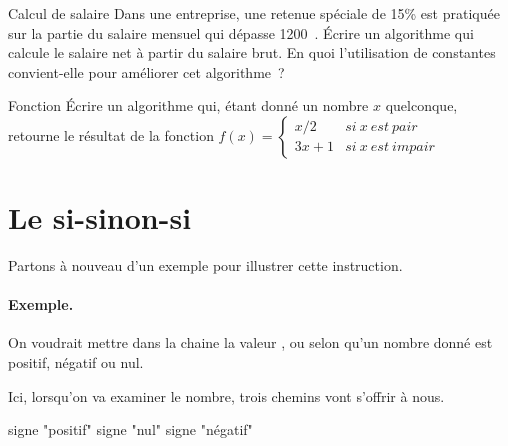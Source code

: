 		\begin{Exercice}{Calcul de salaire}
			Dans une entreprise, 
			une retenue spéciale de 15\% est pratiquée 
			sur la partie du salaire mensuel qui dépasse 1200~\texteuro. 
			Écrire un algorithme qui calcule le salaire net à partir du salaire brut. 
			En quoi l’utilisation de constantes convient-elle pour améliorer cet algorithme~?
		\end{Exercice}

		\begin{Exercice}{Fonction}
			Écrire un algorithme qui, étant donné un nombre $x$ quelconque,
			retourne le résultat de la fonction
			$f(x)=
				\left\{
				\begin{array}{rl}
					x/2 & si \ x \ est\ pair\\
					3x+1 & si \ x \ est \ impair
				\end{array}
				\right.$
		\end{Exercice}


\section{Le si-sinon-si}

	Partons à nouveau d'un exemple pour illustrer cette instruction.
	
	\begin{Emphase}
		\paragraph{Exemple.}
		On voudrait mettre dans la chaine 
		la valeur , 
		ou 
		selon qu'un nombre donné est positif, négatif ou nul.
		
		Ici, lorsqu'on va examiner le nombre, 
		trois chemins vont s'offrir à nous.

		\begin{minipage}{9cm}
		\end{minipage}
		\quad
		\begin{minipage}{4cm}
			\begin{LDA}
					\Let signe \Gets "positif"
					\Let signe \Gets "nul"
				\Else
					\Let signe \Gets "négatif"
				\EndIf
			\end{LDA}
		\end{minipage}
	\end{Emphase}
		
